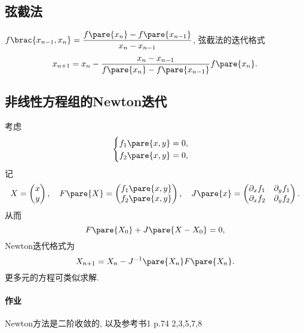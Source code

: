 \documentclass[hidelinks]{ctexart}
\begin{document}
\subsection{弦截法} %
\label{sub:弦截法}

$\displaystyle f\brac{x_{n-1},x_n} = \frac{f\pare{x_n} - f\pare{x_{n-1}}}{x_n - x_{n-1}}$, 弦截法的迭代格式
\[ x_{n+1} = x_n - \frac{x_n - x_{n-1}}{f\pare{x_n} - f\pare{x_{n-1}}}f\pare{x_n}. \]


\subsection{非线性方程组的Newton迭代} %
\label{sub:非线性方程组的newton迭代}

考虑
\[ \begin{cases}
    f_1\pare{x,y} = 0, \\
    f_2\pare{x,y} = 0,
\end{cases} \]
记
\[ X = \begin{pmatrix}
    x \\ y
\end{pmatrix},\quad F\pare{X} = \begin{pmatrix}
    f_1\pare{x,y}\\f_2\pare{x,y}
\end{pmatrix},\quad J\pare{x} = \begin{pmatrix}
    \partial_x f_1 & \partial_y f_1 \\
    \partial_x f_2 & \partial_y f_2
\end{pmatrix}. \]
从而
\[ F\pare{X_0} + J\pare{X-X_0} = 0, \]
Newton迭代格式为
\[ X_{n+1} = X_n - J^{-1}\pare{X_n}F\pare{X_n}. \]
更多元的方程可类似求解.

\paragraph{作业} %
\label{par:作业}

Newton方法是二阶收敛的, 以及参考书1 p.74 2,3,5,7,8



\end{document}
